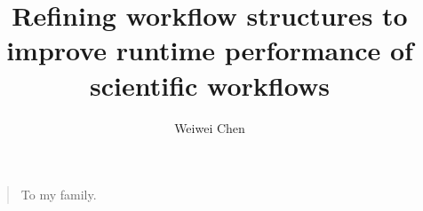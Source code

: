 



\title{Refining workflow structures to improve runtime performance of scientific workflows}
\author{Weiwei Chen}
\maketitle

  \begin{quote}
  To my family.
  \end{quote}



\newpage
\tableofcontents
\newpage
\listoftables
\newpage
\listoffigures


  

\mainmatter


















